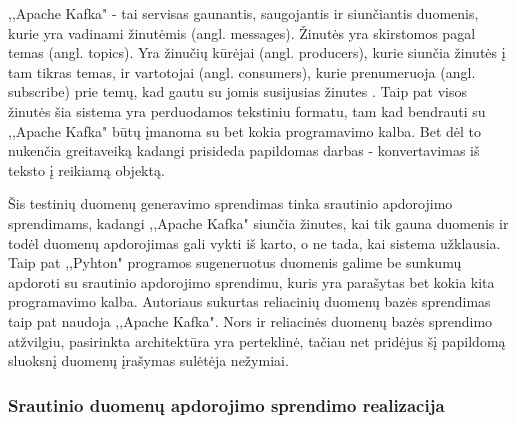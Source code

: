 \documentclass{VUMIFPSkursinis}
\begin{document}
,,Apache Kafka" - tai servisas gaunantis, saugojantis ir siunčiantis duomenis, kurie yra vadinami žinutėmis (angl. messages). Žinutės yra skirstomos pagal temas (angl. topics).
Yra žinučių kūrėjai (angl. producers), kurie siunčia žinutės į tam tikras temas, ir vartotojai (angl. consumers), kurie prenumeruoja (angl. subscribe)
prie temų, kad gautu su jomis susijusias žinutes \cite{thein2014apache}.  Taip pat visos žinutės šia sistema yra perduodamos tekstiniu formatu, 
tam kad bendrauti su ,,Apache Kafka" būtų įmanoma su bet kokia programavimo kalba. Bet dėl to nukenčia greitaveiką kadangi prisideda
papildomas darbas - konvertavimas iš teksto į reikiamą objektą.\par
Šis testinių duomenų generavimo sprendimas tinka srautinio apdorojimo sprendimams, kadangi ,,Apache Kafka" siunčia žinutes,
kai tik gauna duomenis ir todėl duomenų apdorojimas gali vykti iš karto, o ne tada, kai sistema užklausia. Taip pat ,,Pyhton" programos sugeneruotus duomenis galime
be sunkumų apdoroti su srautinio apdorojimo sprendimu, kuris yra parašytas bet kokia kita programavimo kalba. 
Autoriaus sukurtas reliacinių duomenų bazės sprendimas taip pat naudoja ,,Apache Kafka". Nors ir reliacinės duomenų bazės sprendimo atžvilgiu, pasirinkta architektūra yra perteklinė, 
tačiau net pridėjus šį papildomą sluoksnį duomenų įrašymas sulėtėja nežymiai.\par

\subsubsection{Srautinio duomenų apdorojimo sprendimo realizacija}
\end{document}

